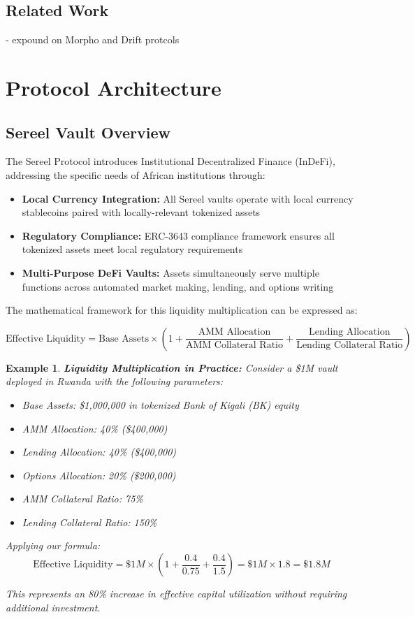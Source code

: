 \documentclass[12pt]{article}
\newtheorem{example}{Example}
\begin{document}
\subsection{Related Work}
- expound on Morpho and Drift protcols

\section{Protocol Architecture}
\subsection{Sereel Vault Overview}
The Sereel Protocol introduces Institutional Decentralized Finance (InDeFi), addressing the specific needs of African institutions through:

\begin{itemize}
  \item \textbf{Local Currency Integration:} All Sereel vaults operate with local currency stablecoins paired with locally-relevant tokenized assets
  \item \textbf{Regulatory Compliance:} ERC-3643 compliance framework ensures all tokenized assets meet local regulatory requirements
  \item \textbf{Multi-Purpose DeFi Vaults:} Assets simultaneously serve multiple functions across automated market making, lending, and options writing
\end{itemize}

The mathematical framework for this liquidity multiplication can be expressed as:

$$\text{Effective Liquidity} = \text{Base Assets} \times \left(1 + \frac{\text{AMM Allocation}}{\text{AMM Collateral Ratio}} + \frac{\text{Lending Allocation}}{\text{Lending Collateral Ratio}}\right)$$

\begin{example}
\textbf{Liquidity Multiplication in Practice:} Consider a \$1M vault deployed in Rwanda with the following parameters:

\begin{itemize}
  \item Base Assets: \$1,000,000 in tokenized Bank of Kigali (BK) equity
  \item AMM Allocation: 40\% (\$400,000)
  \item Lending Allocation: 40\% (\$400,000)
  \item Options Allocation: 20\% (\$200,000)
  \item AMM Collateral Ratio: 75\%
  \item Lending Collateral Ratio: 150\%
\end{itemize}

Applying our formula:
$$\text{Effective Liquidity} = \$1M \times \left(1 + \frac{0.4}{0.75} + \frac{0.4}{1.5}\right) = \$1M \times 1.8 = \$1.8M$$

This represents an 80\% increase in effective capital utilization without requiring additional investment.
\end{example}
\end{document}
